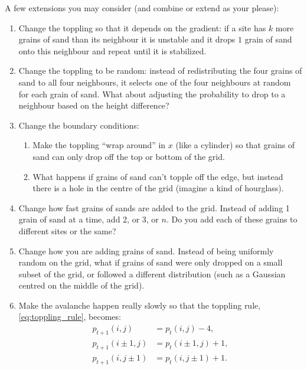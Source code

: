 \documentclass[
  a4paper,             %
  11pt,                %
  oneside,             %
  onecolumn,           %
  bibliography=totoc,  %
  final,               %
]{scrartcl}
\begin{document}
A few extensions you may consider (and combine or extend as your please):
\begin{enumerate}
  \item Change the toppling so that it depends on the gradient: if a site has
        \(k\) more grains of sand than its neighbour it is unstable and it drops \(1\)
        grain of sand onto this neighbour and repeat until it is stabilized.
  \item Change the toppling to be random: instead of redistributing the four
        grains of sand to all four neighbours, it selects one of the four neighbours
        at random for each grain of sand.  What about adjusting the probability to
        drop to a neighbour based on the height difference?
  \item Change the boundary conditions:
        \begin{enumerate}
          \item Make the toppling \enquote{wrap around} in \(x\) (like a cylinder) so
                that grains of sand can only drop off the top or bottom of the grid.
          \item What happens if grains of sand can't topple off the edge, but instead
                there is a hole in the centre of the grid (imagine a kind of hourglass).
        \end{enumerate}
  \item Change how fast grains of sands are added to the grid.  Instead of adding
        1 grain of sand at a time, add 2, or 3, or \(n\).  Do you add each of these
        grains to different sites or the same?
  \item Change how you are adding grains of sand.  Instead of being uniformly
        random on the grid, what if grains of sand were only dropped on a small subset
        of the grid, or followed a different distribution (such as a Gaussian centred
        on the middle of the grid).
  \item Make the avalanche happen really slowly so that the toppling rule,
        \cref{eq:toppling_rule}, becomes:
        \begin{equation}
          \begin{aligned}
            p_{t+1}(i, j)       & = p_{t}(i, j) - 4,       \\
            p_{t+1}(i \pm 1, j) & = p_{t}(i \pm 1, j) + 1, \\
            p_{t+1}(i, j \pm 1) & = p_{t}(i, j \pm 1) + 1.
          \end{aligned}
        \end{equation}

\end{enumerate}
\end{document}
